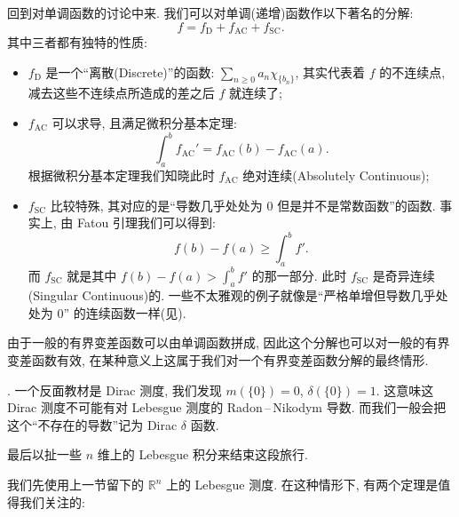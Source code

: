 \documentclass[twoside, fontset=fandol]{ctexart}
\theoremstyle{innocent}
\begin{document}
{回到对单调函数的讨论中来. 我们可以对单调(递增)函数作以下著名的分解:
\[f = f_{\mathrm D} + f_{\mathrm{AC}} + f_{\mathrm{SC}}.\]
其中三者都有独特的性质:
\begin{itemize}
    \item $f_{\mathrm D}$ 是一个``离散(Discrete)''的函数: $\sum_{n\geqslant 0}a_n\chi_{\{b_n\}}$, 其实代表着 $f$ 的不连续点, 减去这些不连续点所造成的差之后 $f$ 就连续了;
    \item $f_{\mathrm{AC}}$ 可以求导, 且满足微积分基本定理: \[\int_a^b f_{\mathrm{AC}}' = f_{\mathrm{AC}}(b)-f_{\mathrm{AC}}(a).\] 根据微积分基本定理我们知晓此时 $f_{\mathrm{AC}}$ 绝对连续(Absolutely Continuous);
    \item $f_{\mathrm{SC}}$ 比较特殊, 其对应的是``导数几乎处处为 $0$ 但是并不是常数函数''的函数. 事实上, 由 Fatou 引理我们可以得到: \[f(b) - f(a) \geqslant \int_{a}^b f'.\] 而 $f_{\mathrm{SC}}$ 就是其中 $f(b) - f(a) > \int_{a}^b f'$ 的那一部分. 此时 $f_{\mathrm{SC}}$ 是奇异连续(Singular Continuous)的. 一些不太雅观的例子就像是``严格单增但导数几乎处处为 $0$'' 的连续函数一样(见\cite{Brown69}).
\end{itemize}
由于一般的有界变差函数可以由单调函数拼成, 因此这个分解也可以对一般的有界变差函数有效, 在某种意义上这属于我们对一个有界变差函数分解的最终情形.
}. 一个反面教材是 Dirac 测度, 我们发现 $m(\{0\})=0$, $\delta(\{0\})=1$. 这意味这 Dirac 测度不可能有对 Lebesgue 测度的 Radon\,--\,Nikodym 导数. 而我们一般会把这个``不存在的导数''记为 Dirac $\delta $ 函数.

最后以扯一些 $n$ 维上的 Lebesgue 积分来结束这段旅行.

我们先使用上一节留下的 $\mathbb R^n$ 上的 Lebesgue 测度. 在这种情形下, 有两个定理是值得我们关注的:
\end{document}
